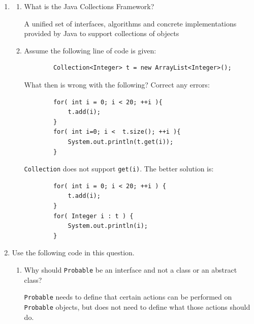 \documentclass[11pt]{article}
\newenvironment{answer}{\large\lstset{basicstyle=\tiny\ttfamily}\color{white}}{}
\newenvironment{answer}{\large\lstset{basicstyle=\large\ttfamily}\color{red}}{}
\begin{document}
\begin{enumerate}
\begin{enumerate}[(a)]
\end{enumerate}

\item 
    \begin{enumerate} 
    \item What is the Java Collections Framework?

    \begin{answer}
        A unified set of interfaces, algorithms and concrete implementations
    provided by Java to support collections of objects
    \end{answer}

    \item Assume the following line of code is given:
    \begin{lstlisting}
        Collection<Integer> t = new ArrayList<Integer>();
    \end{lstlisting}
    What then is wrong with the following? Correct any errors:
    \begin{lstlisting}
        for( int i = 0; i < 20; ++i ){
            t.add(i);
        }
        for( int i=0; i <  t.size(); ++i ){
            System.out.println(t.get(i));
        }
    \end{lstlisting}

    \begin{answer}
    \texttt{Collection} does not support \texttt{get(i)}. The better solution is:
    \begin{lstlisting}
        for( int i = 0; i < 20; ++i ) {
            t.add(i);
        }
        for( Integer i : t ) {
            System.out.println(i);
        }

    \end{lstlisting}
    \end{answer}

    \end{enumerate}
    
\pagebreak
\item Use the following code in this question.



\pagebreak
\begin{enumerate}
\item Why should \texttt{Probable} be an interface and not a class or an abstract class?

\begin{answer}
\texttt{Probable} needs to define that certain actions can be performed on \texttt{Probable} objects, but does not need to define what those actions should do.
\end{answer}


\end{enumerate}
\end{enumerate}
\end{document}
